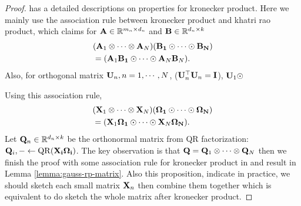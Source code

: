 \begin{proof}
\citep{schacke2013kronecker} has a detailed descriptions on properties for kronecker product. Here we mainly use the association rule between kronecker product and khatri rao product, which claims for $\mathbf{A}\in \mathbb{R}^{m_n\times d_n}$ 
and $\mathbf{B}\in \mathbb{R}^{d_n\times k}$
\begin{equation}
\begin{aligned}
& (\mathbf{A}_1\otimes \cdots \otimes \mathbf{A}_N)(\mathbf{B_1} \odot \cdots \odot \mathbf{B_N})  \\
& = ( \mathbf{A}_1\mathbf{B_1}\odot \cdots \odot  \mathbf{A}_N\mathbf{B}_N). 
\end{aligned}
\end{equation}
Also, for orthogonal matrix $\mathbf{U}_n, n = 1, \cdots, N$, ($\mathbf{U}^\top_n \mathbf{U}_n = \mathbf{I}$),  $\mathbf{U}_1\odot $

Using this association rule,  
\begin{equation}
\begin{aligned}
& (\mathbf{X}_1\otimes \cdots \otimes \mathbf{X}_N)(\mathbf{\Omega_1} \odot \cdots \odot \mathbf{\Omega_N})  \\
& = ( \mathbf{X}_1\mathbf{\Omega_1}\odot \cdots \odot  \mathbf{X}_N\mathbf{\Omega_N}). 
\end{aligned}
\end{equation}
 Let $\mathbf{Q}_n\in \mathbb{R}^{d_n\times k}$ be the orthonormal matrix from QR factorization: $\mathbf{Q}_i, - \gets  \rm{QR}(\mathbf{X_i\Omega_i})$. The key observation is that 
 $\mathbf{Q} = \mathbf{Q}_1\otimes \cdots \otimes \mathbf{Q}_N$ then we finish the proof with some association rule for kronecker product in \cite{schacke2013kronecker} and result in Lemma \ref{lemma:gauss-rp-matrix}.  Also this proposition, indicate in practice, we should sketch each small matrix $\mathbf{X}_n$ then combine them together which is equivalent to do sketch the whole matrix after kronecker product. 
 
\end{proof}





